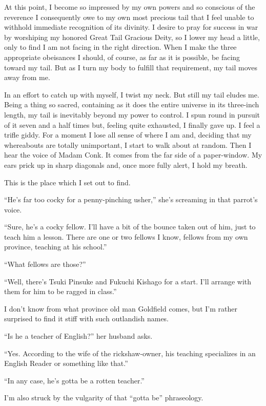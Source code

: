 \documentclass[12pt, openright]{book}
\begin{document}
At this point, I become so impressed by my own powers and so conscious
of the reverence I consequently owe to my own most precious tail that I
feel unable to withhold immediate recognition of its divinity. I desire
to pray for success in war by worshiping my honored Great Tail Gracious
Deity, so I lower my head a little, only to find I am not facing in the
right direction. When I make the three appropriate obeisances I should,
of course, as far as it is possible, be facing toward my tail. But as I
turn my body to fulfill that requirement, my tail moves away from me.

In an effort to catch up with myself, I twist my neck. But still my tail
eludes me. Being a thing so sacred, containing as it does the entire
universe in its three-inch length, my tail is inevitably beyond my power
to control. I spun round in pursuit of it seven and a half times but,
feeling quite exhausted, I finally gave up. I feel a trifle giddy. For a
moment I lose all sense of where I am and, deciding that my whereabouts
are totally unimportant, I start to walk about at random. Then I hear
the voice of Madam Conk. It comes from the far side of a paper-window.
My ears prick up in sharp diagonals and, once more fully alert, I hold
my breath.

This is the place which I set out to find.

``He's far too cocky for a penny-pinching usher,'' she's screaming in
that parrot's voice.

``Sure, he's a cocky fellow. I'll have a bit of the bounce taken out of
him, just to teach him a lesson. There are one or two fellows I know,
fellows from my own province, teaching at his school.''

``What fellows are those?''

``Well, there's Tsuki Pinsuke and Fukuchi Kishago for a start. I'll
arrange with them for him to be ragged in class.''

I don't know from what province old man Goldfield comes, but I'm rather
surprised to find it stiff with such outlandish names.

``Is he a teacher of English?'' her husband asks.

``Yes. According to the wife of the rickshaw-owner, his teaching
specializes in an English Reader or something like that.''

``In any case, he's gotta be a rotten teacher.''

I'm also struck by the vulgarity of that ``gotta be'' phraseology.
\end{document}
